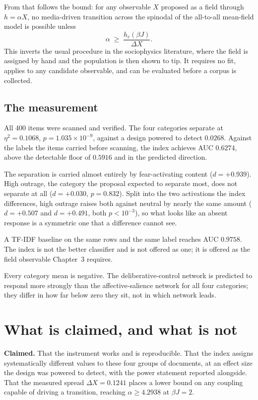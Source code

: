 From that follows the bound: for any observable $X$ proposed as a field through $h = \alpha
X$, no media-driven transition across the spinodal of the all-to-all mean-field model is
possible unless
\begin{equation}
\alpha \;\ge\; \frac{h_c(\beta J)}{\Delta X}.
\end{equation}
This inverts the usual procedure in the sociophysics literature, where the field is assigned
by hand and the population is then shown to tip. It requires no fit, applies to any candidate
observable, and can be evaluated before a corpus is collected.

\subsection{The measurement}

All 400 items were scanned and verified. The four categories separate at $\eta^2 = 0.1068$,
$p = 1.035\times10^{-9}$, against a design powered to detect $0.0268$. Against the labels the
items carried before scanning, the index achieves AUC $0.6274$, above the detectable floor of
$0.5916$ and in the predicted direction.

The separation is carried almost entirely by fear-activating content ($d = +0.939$). High
outrage, the category the proposal expected to separate most, does not separate at all
($d = +0.030$, $p = 0.832$). Split into the two activations the index differences, high
outrage raises both against neutral by nearly the same amount ($d = +0.507$ and $d = +0.491$,
both $p < 10^{-3}$), so what looks like an absent response is a symmetric one that a
difference cannot see.

A TF-IDF baseline on the same rows and the same label reaches AUC $0.9758$. The index is not
the better classifier and is not offered as one; it is offered as the field observable
Chapter~3 requires.

Every category mean is negative. The deliberative-control network is predicted to respond
more strongly than the affective-salience network for all four categories; they differ in how
far below zero they sit, not in which network leads.

\section{What is claimed, and what is not}

\textbf{Claimed.} That the instrument works and is reproducible. That the index assigns
systematically different values to these four groups of documents, at an effect size the
design was powered to detect, with the power statement reported alongside. That the measured
spread $\Delta X = 0.1241$ places a lower bound on any coupling capable of driving a
transition, reaching $\alpha \ge 4.2938$ at $\beta J = 2$.

